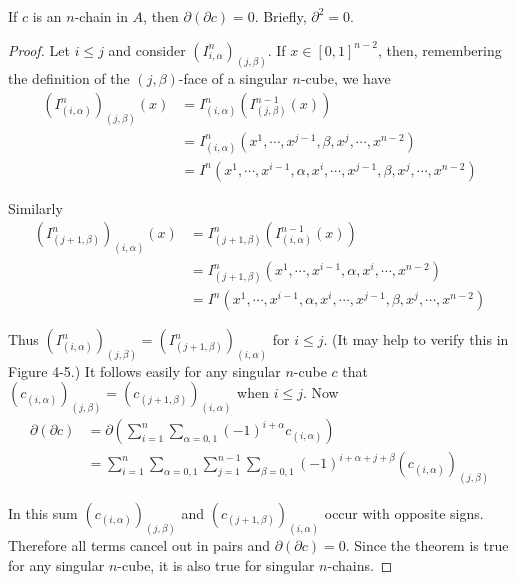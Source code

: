 \begin{theorem}
    If $c$ is an $n$-chain in $A$, then $\partial(\partial c) = 0$. Briefly, 
    $\partial^2 = 0$.
\end{theorem}

\begin{proof}
    Let $i\le j$ and consider $(I^n_{i,\alpha})_{(j,\beta)}$. If $x\in [0,1]^{n-2}$,
    then, remembering the definition of the $(j,\beta)$-face of a singular $n$-cube, we have 
    \begin{align*}
        (I^n_{(i,\alpha)})_{(j,\beta)}(x) 
        & = I^n_{(i,\alpha)}(I^{n-1}_{(j,\beta)}(x))\\
        & = I^n_{(i,\alpha)}(x^1,\cdots,x^{j-1},\beta,x^j,\cdots,x^{n-2}) \\
        & = I^{{n}}(x^{1},\cdots,x^{{i}-1},\alpha,x^{{i}},\cdots,x^{{j}-1},{\beta},x^{{j}},\cdots,x^{{n}-2})
    \end{align*}

    Similarly
    \begin{align*}
        (I^n_{(j+1,\beta)})_{(i,\alpha)}(x) 
        & = I^n_{(j+1,\beta)}(I^{n-1}_{(i,\alpha)}(x))\\
        & = I^n_{(j+1,\beta)}(x^1,\cdots,x^{i-1},\alpha,x^i,\cdots,x^{n-2}) \\
        & = I^{{n}}(x^{1},\cdots,x^{{i-1}},\alpha,x^{i},\cdots,x^{{j}-1},{\beta},x^{{j}},\cdots,x^{{n}-2})
    \end{align*}

    Thus $(I_{(i,\alpha)}^n)_{(j,\beta)}=(I_{(j+1,\beta)}^n)_{(i,\alpha)}$ for $i\le j$.
    (It may help to verify this in Figure 4-5.) It follows easily for any singular
    $n$-cube $c$ that $(c_{(i,\alpha)})_{(j,\beta)}=(c_{(j+1,\beta)})_{(i,\alpha)}$ when $i\le j$.
    Now
    \begin{align*}
        \partial(\partial c)
        & = \partial\left(\sum_{i=1}^n\sum_{\alpha=0,1}(-1)^{i+\alpha}c_{(i,\alpha)}\right) \\
        & = \sum_{i=1}^{n}\sum_{\alpha=0,1}\sum_{j=1}^{n-1}{\sum_{\beta=0,1}^{}{(-1)^{i+\alpha+j+\beta}(c_{(i,\alpha)})_{(j,\beta)}}}
    \end{align*} 

    In this sum $(c_{(i,\alpha)})_{(j,\beta)}$ and $(c_{(j+1,\beta)})_{(i,\alpha)}$ occur 
    with opposite signs. Therefore all terms cancel out in pairs and $\partial(\partial c) = 0$. 
    Since the theorem is true for any singular $n$-cube, it is also true for singular $n$-chains.
\end{proof}


